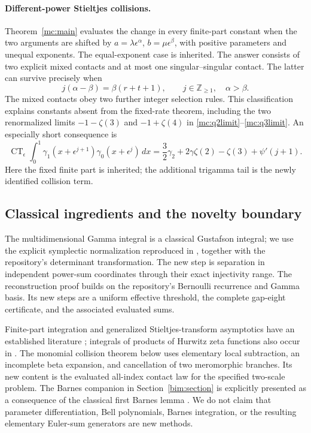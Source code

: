 \documentclass[11pt,a4paper]{article}
\numberwithin{equation}{section}
\theoremstyle{definition}
\theoremstyle{remark}
\begin{document}
\paragraph{Different-power Stieltjes collisions.}
Theorem~\ref{mc:main} evaluates the change in every finite-part constant
when the two arguments are shifted by
$a=\lambda\epsilon^\alpha$, $b=\mu\epsilon^\beta$, with positive
parameters and unequal exponents. The equal-exponent case is inherited.
The answer consists of two explicit mixed contacts and at most one
singular--singular contact. The latter can survive precisely when
\[
 j(\alpha-\beta)=\beta(r+t+1),\qquad j\in\mathbb Z_{\ge1},
 \quad\alpha>\beta.
\]
The mixed contacts obey two further integer selection rules. This
classification explains constants absent from the fixed-rate theorem,
including the two renormalized limits $-1-\zeta(3)$ and $-1+\zeta(4)$
in \eqref{mc:q2limit}--\eqref{mc:q3limit}.
An especially short consequence is
\[
 \operatorname{CT}_{\epsilon}\int_0^1
 \gamma_1(x+\epsilon^{j+1})\gamma_0(x+\epsilon^j)\,dx
 =\frac32\gamma_2+2\gamma\zeta(2)-\zeta(3)+\psi'(j+1).
\]
Here the fixed finite part is inherited; the additional trigamma tail
is the newly identified collision term.

\subsection{Classical ingredients and the novelty boundary}

The multidimensional Gamma integral is a classical Gustafson integral;
we use the explicit symplectic normalization reproduced in
\cite[Eq.~(2)]{DerkachovManashov}, together with the repository's
determinant transformation. The new step is separation in independent
power-sum coordinates through their exact injectivity range.
The reconstruction proof builds on the repository's Bernoulli recurrence
and Gamma basis. Its new steps are a uniform effective threshold,
the complete gap-eight certificate, and the associated evaluated sums.

Finite-part integration and generalized Stieltjes-transform asymptotics
have an established literature \cite{TicaGalapon}; integrals of products
of Hurwitz zeta functions also occur in \cite{ShpotParis}. The monomial
collision theorem below uses elementary local subtraction, an incomplete
beta expansion, and cancellation of two meromorphic branches. Its new
content is the evaluated all-index contact law for the specified
two-scale problem. The Barnes companion in Section~\ref{bim:section}
is explicitly presented as a consequence of the classical first Barnes
lemma \cite[5.13.3]{DLMF}. We do not claim that parameter differentiation,
Bell polynomials, Barnes integration, or the resulting elementary
Euler-sum generators are new methods.
\end{document}
